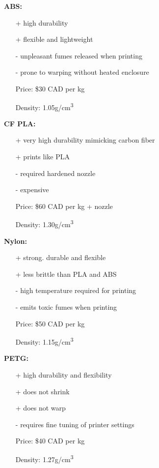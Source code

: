 \documentclass[12pt]{article}
\begin{document}
\textbf{ABS:}
\renewcommand{\labelitemi}{\textperiodcentered}
\begin{itemize}
\item[+] high durability
\item[+] flexible and lightweight
\item[-] unpleasant fumes released when printing
\item[-] prone to warping without heated enclosure
\item[Price:] \$30 CAD per kg
\item[Density:] 1.05g/cm\textsuperscript{3}
\end{itemize}
\vspace{5mm}

\textbf{CF PLA:}
\renewcommand{\labelitemi}{\textperiodcentered}
\begin{itemize}
\item[+] very high durability mimicking carbon fiber
\item[+] prints like PLA
\item[-] required hardened nozzle
\item[-] expensive
\item[Price:] \$60 CAD per kg + nozzle
\item[Density:] 1.30g/cm\textsuperscript{3}
\end{itemize}
\vspace{5mm}

\textbf{Nylon:}
\renewcommand{\labelitemi}{\textperiodcentered}
\begin{itemize}
\item[+] strong. durable and flexible
\item[+] less brittle than PLA and ABS
\item[-] high temperature required for printing
\item[-] emits toxic fumes when printing
\item[Price:] \$50 CAD per kg
\item[Density:] 1.15g/cm\textsuperscript{3}
\end{itemize}
\vspace{5mm}

\textbf{PETG:}
\renewcommand{\labelitemi}{\textperiodcentered}
\begin{itemize}
\item[+] high durability and flexibility
\item[+] does not shrink
\item[+] does not warp
\item[-] requires fine tuning of printer settings
\item[Price:] \$40 CAD per kg
\item[Density:] 1.27g/cm\textsuperscript{3}
\end{itemize}
\end{document}
